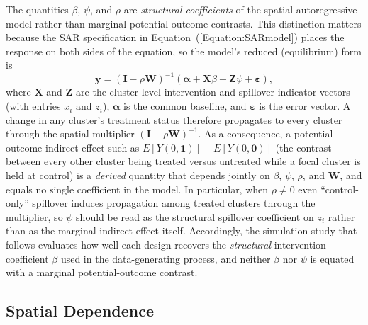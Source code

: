 \documentclass{article}[11pt]
\begin{document}
The quantities $\beta$, $\psi$, and $\rho$ are \emph{structural coefficients} of the spatial autoregressive model rather than marginal potential-outcome contrasts. This distinction matters because the SAR specification in Equation~(\ref{Equation:SARmodel}) places the response on both sides of the equation, so the model's reduced (equilibrium) form is
\begin{equation}\label{Equation:ReducedForm}
    \mathbf{y} = \left(\mathbf{I}-\rho \mathbf{W}\right)^{-1}\left(\boldsymbol\alpha + \mathbf{X}\beta + \mathbf{Z}\psi + \boldsymbol\varepsilon\right),
\end{equation}
where $\mathbf{X}$ and $\mathbf{Z}$ are the cluster-level intervention and spillover indicator vectors (with entries $x_i$ and $z_i$), $\boldsymbol\alpha$ is the common baseline, and $\boldsymbol\varepsilon$ is the error vector. A change in any cluster's treatment status therefore propagates to every cluster through the spatial multiplier $\left(\mathbf{I} - \rho\mathbf{W}\right)^{-1}$. As a consequence, a potential-outcome indirect effect such as $E[Y(0,\mathbf{1})] - E[Y(0,\mathbf{0})]$ (the contrast between every other cluster being treated versus untreated while a focal cluster is held at control) is a \emph{derived} quantity that depends jointly on $\beta$, $\psi$, $\rho$, and $\mathbf{W}$, and equals no single coefficient in the model. In particular, when $\rho \neq 0$ even ``control-only'' spillover induces propagation among treated clusters through the multiplier, so $\psi$ should be read as the structural spillover coefficient on $z_i$ rather than as the marginal indirect effect itself. Accordingly, the simulation study that follows evaluates how well each design recovers the \emph{structural} intervention coefficient $\beta$ used in the data-generating process, and neither $\beta$ nor $\psi$ is equated with a marginal potential-outcome contrast.

\subsection{Spatial Dependence}\label{section:SpatialWeightsMatrix}
\end{document}
